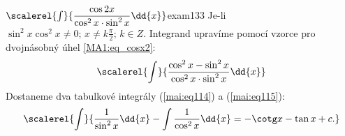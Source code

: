 % 
\begin{mathexam}{\(\protect\scalerel{\int}{\dfrac{\cos2x}{\cos^2x\cdot\sin^2x}\dd{x}}\)}{exam133} 
  Je-li \(\sin^2x\cos^2x\neq0;\, x\neq k\frac{\pi}{2};\, k\in Z\). Integrand upravíme pomocí vzorce
  pro dvojnásobný úhel \ref{MA1:eq_cosx2}:
  \begin{equation*}
    \scalerel{\int}{\frac{\cos^2x-\sin^2x}{\cos^2x\cdot\sin^2x}\dd{x}}
  \end{equation*}
  Dostaneme dva tabulkové integrály (\ref{mai:eq114}) a (\ref{mai:eq115}):
  \begin{gather*}
    \scalerel{\int}{\frac{1}{\sin^2x}\dd{x} -\int\frac{1}{\cos^2x}\dd{x} = -\cotg x - \tan x + c.}
  \end{gather*}
\end{mathexam}